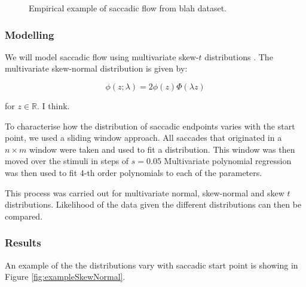 \documentclass[a4paper, onecolumn, oneside, 11pt]{article}
\begin{document}
\begin{figure}
\caption{Empirical example of saccadic flow from blah dataset.}
\label{fig:exampleSaccadic Flow}
\end{figure}

\subsubsection{Modelling}

We will model saccadic flow using multivariate skew-$t$ distributions \citep{azzalini2015}. The multivariate skew-normal distribution \citep{azzalini1996} is given by:

\begin{equation}
\phi(z; \lambda) = 2\phi(z)\Phi(\lambda z) 
\end{equation}

for $z \in \mathbb{R}$. I think. 

To characterise how the distribution of saccadic endpoints varies with the start point, we used a sliding window approach. All saccades that originated in a $n\times m$ window were taken and used to fit a distribution. This window was then moved over the stimuli in steps of $s=0.05$  Multivariate polynomial regression was then used to fit 4-th order polynomials to each of the parameters. 

This process was carried out for multivariate normal, skew-normal and skew $t$ distributions. Likelihood of the data given the different distributions can then be compared. 

\subsubsection{Results}

An example of the the distributions vary with saccadic start point is showing in Figure \ref{fig:exampleSkewNormal}.
\end{document}
